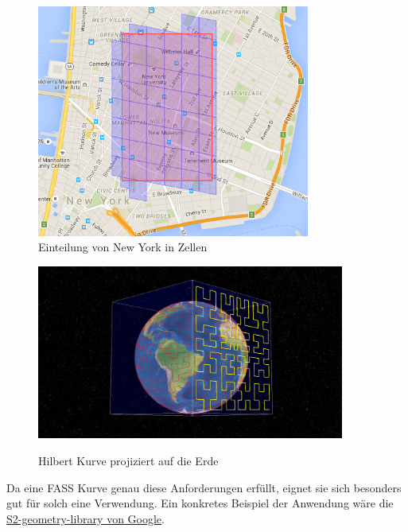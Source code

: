 \documentclass[course=erap]{aspdoc}
\begin{document}
\begin{figure}[h]
    \centering
    \begin{minipage}{0.45\textwidth}
        \centering
        \includegraphics[width=0.8\textwidth]{Map}\\
        \caption{Einteilung von New York in Zellen}
        \label{fig:Gmaps}
    \end{minipage}\hfill
    \begin{minipage}{0.45\textwidth}
        \centering
        \includegraphics[width=0.9\textwidth]{Earth} \\
        \caption{Hilbert Kurve projiziert auf die Erde}
        \label{fig:hilbertCurveOnEarth}
    \end{minipage}
\end{figure}

Da eine FASS Kurve genau diese Anforderungen erfüllt, eignet sie sich besonders gut für solch eine Verwendung. Ein konkretes Beispiel der Anwendung wäre die \href{https://code.google.com/archive/p/s2-geometry-library/}{S2-geometry-library von Google}. 
\end{document}
